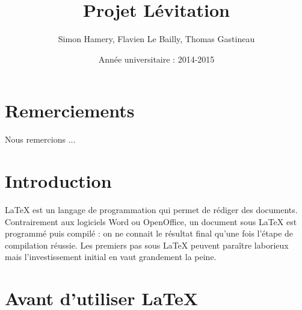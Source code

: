 \documentclass[a4paper,11pt]{report}
\title{Projet Lévitation}
\author{Simon Hamery, Flavien Le Bailly, Thomas Gastineau}
\date{Année universitaire :  2014-2015}
\begin{document}
\maketitle  %
\newpage  %

 \setcounter{page}{1} %
\chapter*{Remerciements} %
Nous remercions ...

\newpage
\null
\thispagestyle{empty}
\newpage

{\tableofcontents} 
\listoffigures


\newpage

\chapter*{Introduction}
 \setcounter{page}{1} %

 LaTeX  est un langage de programmation qui permet de rédiger des documents.  Contrairement aux logiciels Word ou OpenOffice, un document sous LaTeX est programmé puis compilé : on ne connait le résultat final qu'une fois l'étape de compilation réussie. Les premiers pas sous LaTeX  peuvent paraître laborieux mais l'investissement initial en vaut grandement la peine. 
 


\chapter{Avant d'utiliser \LaTeX}
\end{document}
